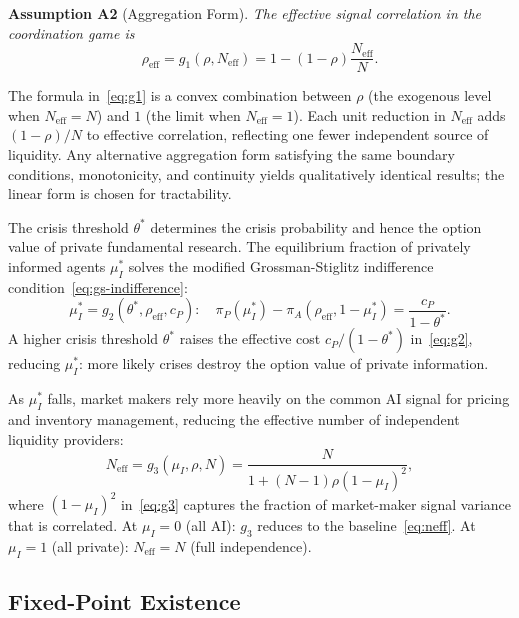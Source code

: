 \medskip\noindent\textbf{Assumption A2} (Aggregation Form).\label{ass:g1}
\emph{The effective signal correlation in the coordination game is}
\begin{equation}\label{eq:g1}
  \rho_{\text{eff}} = g_1(\rho, N_{\text{eff}}) = 1 - (1-\rho)\frac{N_{\text{eff}}}{N}.
\end{equation}

\noindent The formula in~\eqref{eq:g1} is a convex combination between $\rho$ (the exogenous level when $N_{\text{eff}} = N$) and $1$ (the limit when $N_{\text{eff}} = 1$). Each unit reduction in $N_{\text{eff}}$ adds $(1-\rho)/N$ to effective correlation, reflecting one fewer independent source of liquidity. Any alternative aggregation form satisfying the same boundary conditions, monotonicity, and continuity yields qualitatively identical results; the linear form is chosen for tractability.

 The crisis threshold $\theta^*$ determines the crisis probability and hence the option value of private fundamental research. The equilibrium fraction of privately informed agents $\mu_I^*$ solves the modified Grossman-Stiglitz indifference condition~\eqref{eq:gs-indifference}:
\begin{equation}\label{eq:g2}
  \mu_I^* = g_2(\theta^*, \rho_{\text{eff}}, c_P): \quad \pi_P(\mu_I^*) - \pi_A(\rho_{\text{eff}}, 1-\mu_I^*) = \frac{c_P}{1-\theta^*}.
\end{equation}
A higher crisis threshold $\theta^*$ raises the effective cost $c_P/(1-\theta^*)$ in~\eqref{eq:g2}, reducing $\mu_I^*$: more likely crises destroy the option value of private information.

 As $\mu_I^*$ falls, market makers rely more heavily on the common AI signal for pricing and inventory management, reducing the effective number of independent liquidity providers:
\begin{equation}\label{eq:g3}
  N_{\text{eff}} = g_3(\mu_I, \rho, N) = \frac{N}{1+(N-1)\rho(1-\mu_I)^2},
\end{equation}
where $(1-\mu_I)^2$ in~\eqref{eq:g3} captures the fraction of market-maker signal variance that is correlated. At $\mu_I = 0$ (all AI): $g_3$ reduces to the baseline~\eqref{eq:neff}. At $\mu_I = 1$ (all private): $N_{\text{eff}} = N$ (full independence).

\subsection{Fixed-Point Existence}

